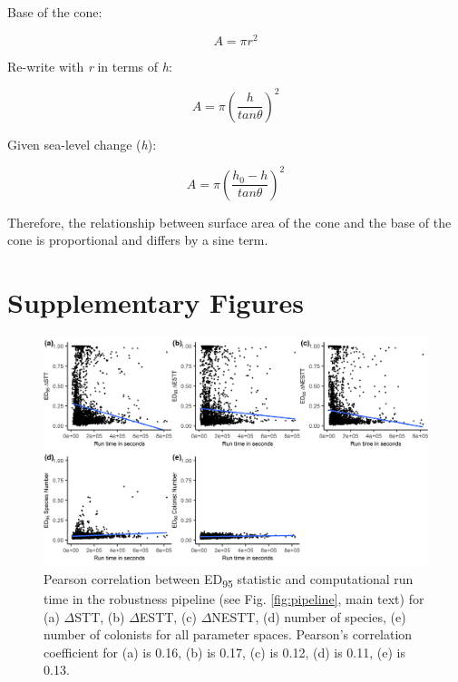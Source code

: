 Base of the cone: 

\[ A = \pi r^2 \]

Re-write with \textit{r} in terms of \textit{h}:

\[ A = \pi \left( \frac{h}{tan \theta} \right)^2 \]

Given sea-level change (\textit{h}): 

\[ A = \pi \left( \frac{h_0 - h}{tan \theta} \right) ^2 \]

Therefore, the relationship between surface area of the cone and the base of the cone is proportional and differs by a sine term.

\clearpage

\section*{Supplementary Figures}

\begin{figure}[ht]
    \centering
    \includegraphics{runtime_ed95_corr.png}
    \caption{Pearson correlation between ED\textsubscript{95} statistic and computational run time in the robustness pipeline (see Fig. \ref{fig:pipeline}, main text) for (a) $\Delta$STT, (b) $\Delta$ESTT, (c) $\Delta$NESTT, (d) number of species, (e) number of colonists for all parameter spaces. Pearson’s correlation coefficient for (a) is 0.16, (b) is 0.17, (c) is 0.12, (d) is 0.11, (e) is 0.13.}
    \label{fig:runtime_ed95_corr}
\end{figure}

